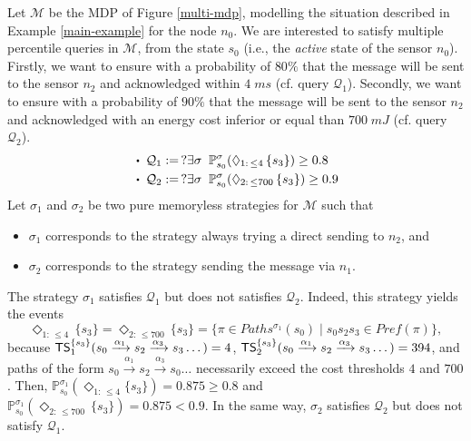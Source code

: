 \begin{example} \label{SSPQ-example1}
  Let $\mathcal{M}$ be the MDP of Figure \ref{multi-mdp}, modelling the situation described in Example \ref{main-example} for the node $n_0$.
  We are interested to satisfy multiple percentile queries in $\mathcal{M}$, from the state $s_0$ (i.e., the \textit{active} state of the sensor $n_0$).
  Firstly, we want to ensure with a probability of $80 \%$ that the message will be sent to the sensor $n_2$ and acknowledged within $4 \; ms$ (cf. query $\mathcal{Q}_1$). Secondly, we want to ensure with a probability of $90 \%$ that the message will be sent to the sensor $n_2$ and acknowledged with an energy cost inferior or equal than $700 \; mJ$ (cf. query $\mathcal{Q}_2$).
  \begin{align*}
    &\bigcdot\;\mathcal{Q}_1 := \,  ?\exists \sigma \;\; \mathbb{P}^{\sigma}_{s_0}(\Diamond_{1: \, \leq 4} \, \{s_3\}) \geq 0.8 \\
    &\bigcdot\;\mathcal{Q}_2 := \, ? \exists \sigma \;\; \mathbb{P}_{s_0}^{\sigma}(\Diamond_{2: \, \leq 700} \, \{s_3\}) \geq 0.9
  \end{align*}
  Let $\sigma_1$ and $\sigma_2$ be two pure memoryless strategies for $\mathcal{M}$ such that
  \begin{itemize}
    \item $\sigma_1$ corresponds to the strategy always trying a direct sending to $n_2$, and
    \item $\sigma_2$ corresponds to the strategy sending the message via $n_1$.
  \end{itemize}
  The strategy $\sigma_1$ satisfies $\mathcal{Q}_1$ but does not satisfies $\mathcal{Q}_2$.
  Indeed, this strategy yields %
  the events
  \[\Diamond_{1:\, \leq 4}\, \{s_3\} = \Diamond_{2:\, \leq 700}\, \{s_3\} = \{ \pi \in Paths^{\sigma_1}(s_0) \; | \; s_0 %
  s_2 %
  s_3 %
  \in Pref(\pi) \},\]
  because $\text{\sffamily TS}^{\{s_3\}}_1 (s_0 \xrightarrow{\alpha_1}s_2 \xrightarrow{\alpha_3}s_3 \dots) = 4 $,
  $\text{\sffamily TS}^{\{s_3\}}_2 (s_0 \xrightarrow{\alpha_1}s_2 \xrightarrow{\alpha_3}s_3 \dots) = 394 $, and
  paths of the form $s_0 \xrightarrow{\alpha_1}s_2 \xrightarrow{\alpha_3}s_0 \dots$ necessarily exceed the cost thresholds $4$ and $700$.
  Then, $\mathbb{P}_{s_0}^{\sigma_1}(\Diamond_{1:\, \leq 4}\{s_3\}) = 0.875 \geq 0.8$ and $\mathbb{P}_{s_0}^{\sigma_1}(\Diamond_{2: \, \leq 700} \, \{s_3\}) = 0.875<0.9$.
  In the same way, $\sigma_2$ satisfies $\mathcal{Q}_2$ but does not satisfy $\mathcal{Q}_1$.

\end{example}
